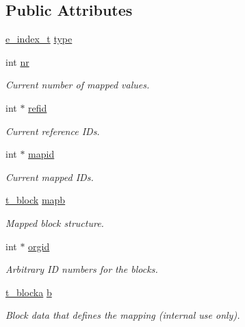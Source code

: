 \subsection*{\-Public \-Attributes}
\begin{DoxyCompactItemize}
\item 
\hyperlink{include_2indexutil_8h_ad7330829cb93245b9de7ed268cf6ba67}{e\-\_\-index\-\_\-t} \hyperlink{structgmx__ana__indexmap__t_a806f5456c1f90f4bb38c223aa4f81244}{type}
\item 
int \hyperlink{structgmx__ana__indexmap__t_a23442a6a8b1fee0aaef41f5a7e69d676}{nr}
\begin{DoxyCompactList}\small\item\em \-Current number of mapped values. \end{DoxyCompactList}\item 
int $\ast$ \hyperlink{structgmx__ana__indexmap__t_a48e42d65b5d5df29d1a3ed8c2264be77}{refid}
\begin{DoxyCompactList}\small\item\em \-Current reference \-I\-Ds. \end{DoxyCompactList}\item 
int $\ast$ \hyperlink{structgmx__ana__indexmap__t_a786679766d4c1bcd5261be047660d236}{mapid}
\begin{DoxyCompactList}\small\item\em \-Current mapped \-I\-Ds. \end{DoxyCompactList}\item 
\hyperlink{structt__block}{t\-\_\-block} \hyperlink{structgmx__ana__indexmap__t_a1f237809f38e3e554d512b5fcd753107}{mapb}
\begin{DoxyCompactList}\small\item\em \-Mapped block structure. \end{DoxyCompactList}\item 
int $\ast$ \hyperlink{structgmx__ana__indexmap__t_ad062bcdfae92123a664d4db636d9f1b1}{orgid}
\begin{DoxyCompactList}\small\item\em \-Arbitrary \-I\-D numbers for the blocks. \end{DoxyCompactList}\item 
\hyperlink{structt__blocka}{t\-\_\-blocka} \hyperlink{structgmx__ana__indexmap__t_aea46d1a0ff405c100ab4466ea7092529}{b}
\begin{DoxyCompactList}\small\item\em \-Block data that defines the mapping (internal use only). \end{DoxyCompactList}\item 

\end{DoxyCompactItemize}
